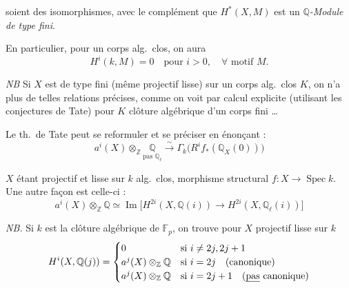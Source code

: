 \documentclass[11pt,a4paper]{article}
\begin{document}
soient des isomorphismes, avec le complément que $H^{*}(X, M)$ est un
\emph{$\mathbb{Q}$-Module de type fini}.

En particulier, pour un corps alg.\ clos, on aura
\[
  H^{i}(k, M) = 0 \quad \text{pour } i > 0, \quad \forall \text{ motif } M .
\]

\emph{NB} Si $X$ est de type fini (même projectif lisse) sur un corps alg.\
clos $K$, on n'a plus de telles relations précises, comme on
voit par calcul explicite (utilisant les conjectures de Tate) pour $K$
clôture algébrique d'un corps fini …

Le th.\ de Tate peut se reformuler et se préciser en énonçant :
\[
  a^{i}(X) \otimes_{\mathbb{Z}} \underset{\text{pas } \mathbb{Q}_{\ell}}{\mathbb{Q}} \xrightarrow{\;\sim\;} \Gamma_{k}\bigl(R^{i}f_{*}(\mathbb{Q}_{X}(0))\bigr)
\]

$X$ étant projectif et lisse sur $k$ alg.\ clos, morphisme structural
$f : X \to \operatorname{Spec} k$.
Une autre façon est celle-ci :
\[
  \boxed{\; a^{i}(X) \otimes_{\mathbb{Z}} \mathbb{Q} \simeq \operatorname{Im}\bigl[ H^{2i}(X, \mathbb{Q}(i)) \longrightarrow H^{2i}(X, \mathbb{Q}_{\ell}(i)) \bigr] \;}
\]

\emph{NB.} Si $k$ est la clôture algébrique de $\mathbb{F}_{p}$, on trouve
\ill{} \ill{} pour $X$ projectif lisse sur $k$
\[
  H^{i}(X, \mathbb{Q}(j)) =
  \begin{cases}
    0 & \text{si } i \neq 2j, 2j+1 \\
    a^{j}(X) \otimes_{\mathbb{Z}} \mathbb{Q} & \text{si } i = 2j \quad \text{(canonique)} \\
    a^{j}(X) \otimes_{\mathbb{Z}} \mathbb{Q} & \text{si } i = 2j+1 \quad \text{(\emph{pas} canonique)}
  \end{cases}
\]
\end{document}
